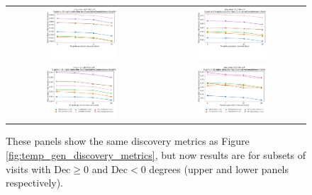 \documentclass[preprintm,linenumbers]{aastex631}
\begin{document}
		\begin{figure}
			\centering
			\begin{tabular}{c c}
    				\includegraphics[width=0.5\textwidth]{results/one_snap_v4_0_n_visits_4_Dec_lt_0_discovery_metric_bright.pdf} &
				\includegraphics[width=0.5\textwidth]{results/one_snap_v4_0_n_visits_4_Dec_lt_0_discovery_metric_faint.pdf} \\
    				\includegraphics[width=0.5\textwidth]{results/one_snap_v4_0_n_visits_4_Dec_gtreq_0_discovery_metric_bright.pdf} &
				\includegraphics[width=0.5\textwidth]{results/one_snap_v4_0_n_visits_4_Dec_gtreq_0_discovery_metric_faint.pdf}
			\end{tabular}
			\caption{These panels show the same discovery metrics as Figure \protect\ref{fig:temp_gen_discovery_metrics}, but now results are for subsets of visits with Dec$\geq0$ and Dec$<0$ degrees (upper and lower panels respectively). 
			}
			\label{fig:temp_gen_discovery_metrics_dec}
		\end{figure}
		
\end{document}
